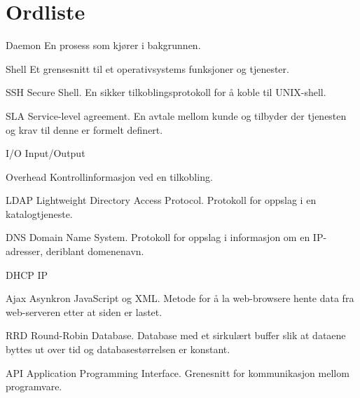\chapter*{Ordliste}
Daemon
En prosess som kjører i bakgrunnen.

Shell
Et grensesnitt til et operativsystems funksjoner og tjenester.

SSH
Secure Shell. En sikker tilkoblingsprotokoll for å koble til UNIX-shell.

SLA
Service-level agreement. En avtale mellom kunde og tilbyder der tjenesten og krav til denne er formelt definert.

I/O
Input/Output

Overhead
Kontrollinformasjon ved en tilkobling.

LDAP
Lightweight Directory Access Protocol. Protokoll for oppslag i en katalogtjeneste.

DNS
Domain Name System. Protokoll for oppslag i informasjon om en IP-adresser, deriblant domenenavn.

DHCP
IP

Ajax
Asynkron JavaScript og XML. Metode for å la web-browsere hente data fra web-serveren etter at siden er lastet.

RRD
Round-Robin Database. Database med et sirkulært buffer slik at dataene byttes ut over tid og databasestørrelsen er konstant.

API
Application Programming Interface. Grenesnitt for kommunikasjon mellom programvare.
